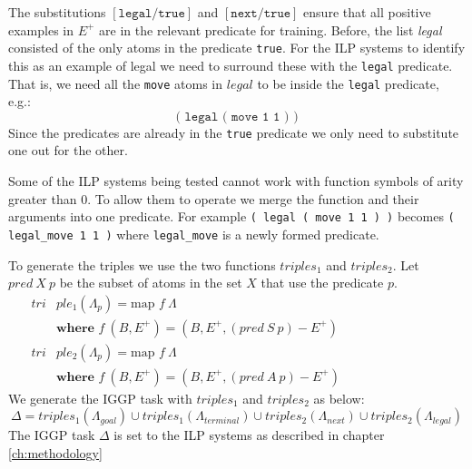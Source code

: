 The substitutions $[\texttt{legal}/\texttt{true}]$ and $[\texttt{next}/\texttt{true}]$ ensure that all positive examples in $E^+$ are in the relevant predicate for training. Before, the list \textit{legal} consisted of the only atoms in the predicate \texttt{true}. For the ILP systems to identify this as an example of legal we need to surround these with the \texttt{legal} predicate. That is, we need all the \texttt{move} atoms in $legal$ to be inside the \texttt{legal} predicate, e.g.:
\[\texttt{( legal ( move 1 1 ) )}\]
Since the predicates are already in the \texttt{true} predicate we only need to substitute one out for the other.

Some of the ILP systems being tested cannot work with function symbols of arity greater than 0. To allow them to operate we merge the function and their arguments into one predicate. For example \texttt{( legal ( move 1 1 ) )} becomes \verb|( legal_move 1 1 )| where \verb|legal_move| is a newly formed predicate.
 
To generate the triples we use the two functions $triples_1$ and $triples_2$. Let $pred\ X\ p$ be the subset of atoms in the set $X$ that use the predicate $p$.
\begin{align*}
tri&ple_1(\Lambda_p) = \text{map } f\ \Lambda\\
&\textbf{where } f\ (B,E^+) = (B,E^+,(pred\ S\ p) - E^+) \ \ \ \ \ \ \ \ \ \ \ \ \ \ \ \ \ \ \ \ \ \ \ \ \ \ \ \ \ \ \ \ \ \ \ \ \ \\
tri&ple_2(\Lambda_p) = \text{map } f\ \Lambda \\
&\textbf{where } f\ (B,E^+) = (B,E^+,(pred\ A\ p) - E^+)
\end{align*}
We generate the IGGP task with $triples_1$ and $triples_2$ as below:
\[\Delta = triples_1(\Lambda_{goal}) \cup triples_1(\Lambda_{terminal}) \cup triples_2(\Lambda_{next}) \cup triples_2(\Lambda_{legal})\]
The IGGP task $\Delta$ is set to the ILP systems as described in chapter \ref{ch:methodology}
